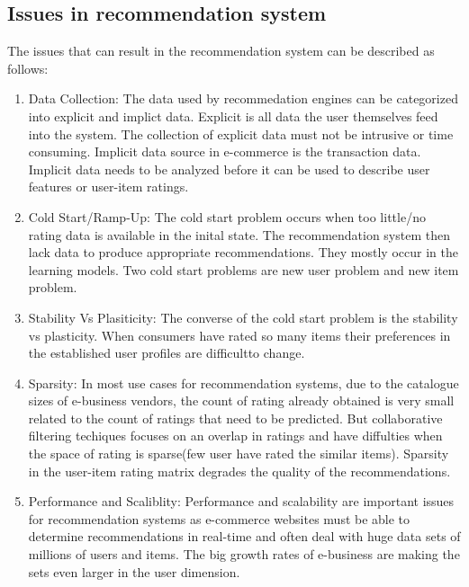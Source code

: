 \subsection{Issues in recommendation system}
The issues \cite{recommend} that can result in the recommendation system can be described as follows:
\begin{enumerate}
\item Data Collection: The data used by recommedation engines can be categorized into explicit and implict data. Explicit is all data the user themselves feed into the system. The collection of explicit data must not be intrusive or time consuming. Implicit data source in e-commerce is the transaction data. Implicit data needs to be analyzed before it can be used to describe user features or user-item ratings.
\item Cold Start/Ramp-Up: The cold start problem occurs when too little/no rating data is available in the inital state. The recommendation system then lack data to produce appropriate recommendations. They mostly occur in the learning models. Two cold start problems are new user problem and new item problem.
\item Stability Vs Plasiticity: The converse of the cold start problem is the stability vs plasticity. When consumers have rated so many items their preferences in the established user profiles are difficultto change. 
\item Sparsity: In most use cases for recommendation systems, due to the catalogue sizes of e-business vendors, the count of rating already obtained is very small related to the count of ratings that need to be predicted. But collaborative filtering techiques focuses on an overlap in ratings and have diffulties when the space of rating is sparse(few user have rated the similar items). Sparsity in the user-item rating matrix degrades the quality of the recommendations.
\item Performance and Scaliblity: Performance and scalability are important issues for recommendation systems as e-commerce websites must be able to determine recommendations in real-time and often deal with huge data sets of millions of users and items. The big growth rates of e-business are making the sets even larger in the user dimension.

\end{enumerate}
